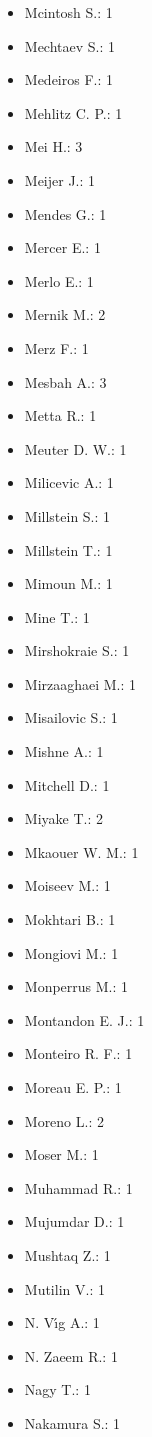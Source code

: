 \begin{itemize}
\item Mcintosh S.: 1
\item Mechtaev S.: 1
\item Medeiros F.: 1
\item Mehlitz C. P.: 1
\item Mei H.: 3
\item Meijer J.: 1
\item Mendes G.: 1
\item Mercer E.: 1
\item Merlo E.: 1
\item Mernik M.: 2
\item Merz F.: 1
\item Mesbah A.: 3
\item Metta R.: 1
\item Meuter D. W.: 1
\item Milicevic A.: 1
\item Millstein S.: 1
\item Millstein T.: 1
\item Mimoun M.: 1
\item Mine T.: 1
\item Mirshokraie S.: 1
\item Mirzaaghaei M.: 1
\item Misailovic S.: 1
\item Mishne A.: 1
\item Mitchell D.: 1
\item Miyake T.: 2
\item Mkaouer W. M.: 1
\item Moiseev M.: 1
\item Mokhtari B.: 1
\item Mongiovi M.: 1
\item Monperrus M.: 1
\item Montandon E. J.: 1
\item Monteiro R. F.: 1
\item Moreau E. P.: 1
\item Moreno L.: 2
\item Moser M.: 1
\item Muhammad R.: 1
\item Mujumdar D.: 1
\item Mushtaq Z.: 1
\item Mutilin V.: 1
\item N. V\'{\i}g A.: 1
\item N. Zaeem R.: 1
\item Nagy T.: 1
\item Nakamura S.: 1

\end{itemize}
